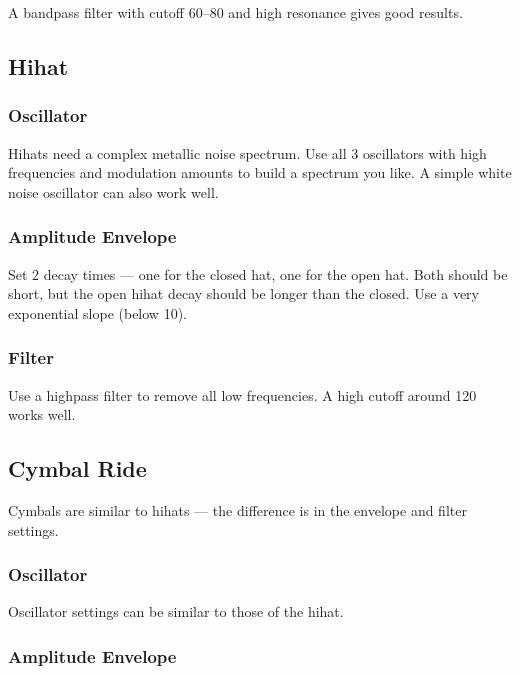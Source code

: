 A bandpass filter with cutoff 60--80 and high resonance gives good
results.

\subsection{Hihat}\label{hihat}

\subsubsection{Oscillator}\label{oscillator-2}

Hihats need a complex metallic noise spectrum. Use all 3 oscillators
with high frequencies and modulation amounts to build a spectrum you
like. A simple white noise oscillator can also work well.

\subsubsection{Amplitude Envelope}\label{amplitude-envelope-3}

Set 2 decay times --- one for the closed hat, one for the open hat. Both
should be short, but the open hihat decay should be longer than the
closed. Use a very exponential slope (below 10).

\subsubsection{Filter}\label{filter-1}

Use a highpass filter to remove all low frequencies. A high cutoff
around 120 works well.

\subsection{Cymbal Ride}\label{cymbal-ride}

Cymbals are similar to hihats --- the difference is in the envelope and
filter settings.

\subsubsection{Oscillator}\label{oscillator-3}

Oscillator settings can be similar to those of the hihat.

\subsubsection{Amplitude Envelope}\label{amplitude-envelope-4}

